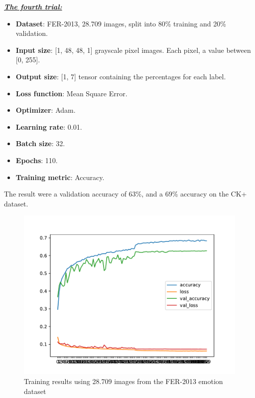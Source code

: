 \documentclass[runningheads,a4paper,11pt]{report}
\begin{document}
\clearpage
\underline{\textbf{\emph{The fourth trial:}}}
\begin{itemize}
	\item \textbf{Dataset}: FER-2013, 28.709 images, split into 80\% training and 20\% validation.
	\item \textbf{Input size}: [1, 48, 48, 1] grayscale pixel images. Each pixel, a value between [0, 255].
	\item \textbf{Output size}: [1, 7] tensor containing the percentages for each label.
	\item \textbf{Loss function}: Mean Square Error.
	\item \textbf{Optimizer}: Adam.
	\item \textbf{Learning rate}: 0.01.
	\item \textbf{Batch size}: 32.
	\item \textbf{Epochs}: 110.
	\item \textbf{Training metric}: Accuracy.
\end{itemize}
The result were a validation accuracy of 63\%, and a 69\% accuracy on the CK+ dataset.
\begin{figure}[htbp]
\begin{center}
	\includegraphics[scale=0.8]{Fig/fer_training_28k_001_mean_square.pdf}
	\caption{Training results using 28.709 images from the FER-2013 emotion dataset}
	\label{fer_training_28k_001_mean_square}
\end{center}
\end{figure}
\end{document}
